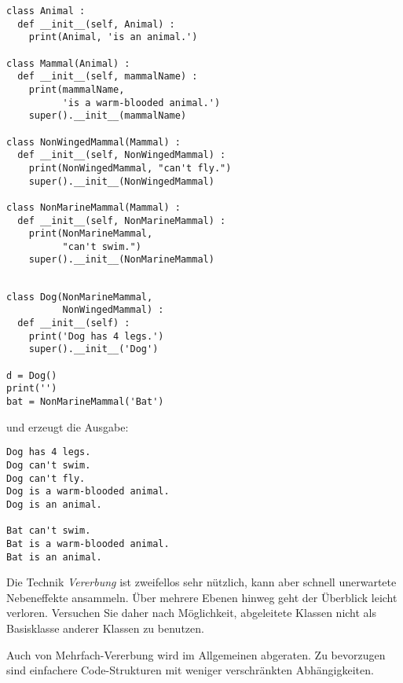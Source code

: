 \begin{codebox}
\begin{verbatim}
class Animal :
  def __init__(self, Animal) :
    print(Animal, 'is an animal.')
    
class Mammal(Animal) :
  def __init__(self, mammalName) :
    print(mammalName, 
          'is a warm-blooded animal.')
    super().__init__(mammalName)

class NonWingedMammal(Mammal) :
  def __init__(self, NonWingedMammal) :
    print(NonWingedMammal, "can't fly.")
    super().__init__(NonWingedMammal)

class NonMarineMammal(Mammal) :
  def __init__(self, NonMarineMammal) :
    print(NonMarineMammal, 
          "can't swim.")
    super().__init__(NonMarineMammal)
\end{verbatim}
\end{codebox}
%
\begin{codebox}[]
\begin{verbatim}
    
class Dog(NonMarineMammal,
          NonWingedMammal) :
  def __init__(self) :
    print('Dog has 4 legs.')
    super().__init__('Dog')

d = Dog()
print('')
bat = NonMarineMammal('Bat')
\end{verbatim}
\end{codebox}

und erzeugt die Ausgabe:

\begin{cmdbox}
\begin{verbatim}
Dog has 4 legs.
Dog can't swim.
Dog can't fly.
Dog is a warm-blooded animal.
Dog is an animal.

Bat can't swim.
Bat is a warm-blooded animal.
Bat is an animal.
\end{verbatim}
\end{cmdbox}


\begin{hintbox}
Die Technik \emph{Vererbung} ist zweifellos sehr nützlich, kann aber schnell unerwartete Nebeneffekte ansammeln. Über mehrere Ebenen hinweg geht der Überblick leicht verloren. Versuchen Sie daher nach Möglichkeit, abgeleitete Klassen nicht als Basisklasse anderer Klassen zu benutzen.

Auch von Mehrfach-Vererbung wird im Allgemeinen abgeraten. Zu bevorzugen sind einfachere Code-Strukturen mit weniger verschränkten Abhängigkeiten.
\end{hintbox}
